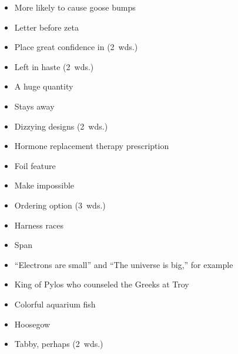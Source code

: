 {    \begin{itemize}
      \item
        More likely to cause goose bumps
      \item
        Letter before zeta
    \end{itemize}
  \item
    \begin{itemize}
      \item
        Place great confidence in (2~wds.)
      \item
        Left in haste (2~wds.)
    \end{itemize}
  \item
    \begin{itemize}
      \item
        A huge quantity
      \item
        Stays away
    \end{itemize}
  \item
    \begin{itemize}
      \item
        Dizzying designs (2~wds.)
      \item
        Hormone replacement therapy prescription
    \end{itemize}
  \item
    \begin{itemize}
      \item
        Foil feature
      \item
        Make impossible
    \end{itemize}
  \item
    \begin{itemize}
      \item
        Ordering option (3~wds.)
      \item
        Harness races
    \end{itemize}
}{%
  \item
    \begin{itemize}
      \item
        Span
      \item
        ``Electrons are small'' and ``The universe is big,'' for example
      \item
        King of Pylos who counseled the Greeks at Troy
      \item
        Colorful aquarium fish
      \item
        Hoosegow
      \item
        Tabby, perhaps (2~wds.)
    \end{itemize}
}
